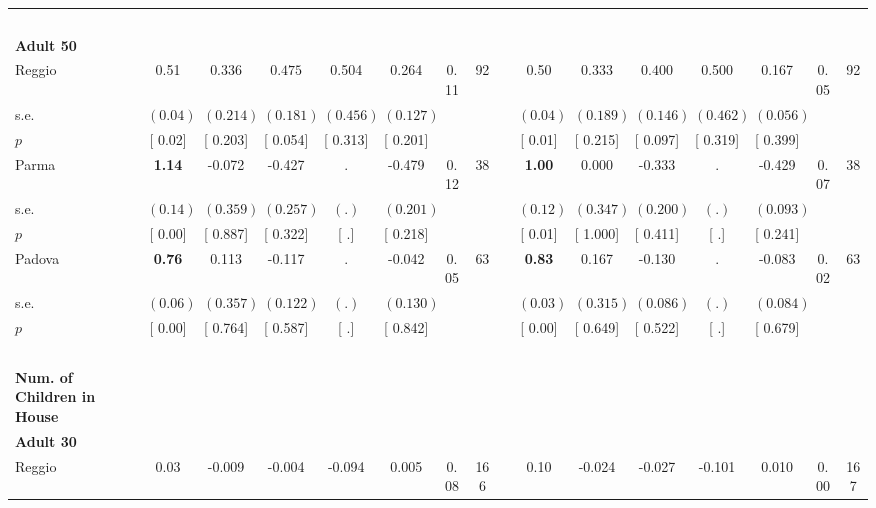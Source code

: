 \begin{longtable}{L{8em} c c c c c c c p{1em} c c c c c c c}
~\\[1em]
\quad \quad \textbf{Adult 50} & & & & & & & & & & & & & & & \\* 
\quad \quad \quad Reggio& 0.51 &     0.336 & $ \mathbf{    0.475}$ &     0.504 &     0.264 &      0.11 &        92 & & 0.50 &     0.333 & $ \mathbf{    0.400}$ &     0.500 &     0.167 &      0.05 &        92  \\*
\quad \quad \quad \quad s.e.& $ (     0.04)$ & $ (    0.214)$ & $ (    0.181)$ & $ (    0.456)$ & $ (    0.127)$ & & & & $ (     0.04)$ & $ (    0.189)$ & $ (    0.146)$ & $ (    0.462)$ & $ (    0.056)$ & &  \\*
\quad \quad \quad \quad $ p$ & [     0.02] & [    0.203] & [    0.054] & [    0.313] & [    0.201] & & & & [     0.01] & [    0.215] & [    0.097] & [    0.319] & [    0.399] & &  \\[1em]
\quad \quad \quad Parma& \textbf{     1.14} &    -0.072 &    -0.427 &         . &    -0.479 &      0.12 &        38 & & \textbf{     1.00} &     0.000 &    -0.333 &         . &    -0.429 &      0.07 &        38  \\*
\quad \quad \quad \quad s.e.& $ (     0.14)$ & $ (    0.359)$ & $ (    0.257)$ & $ (        .)$ & $ (    0.201)$ & & & & $ (     0.12)$ & $ (    0.347)$ & $ (    0.200)$ & $ (        .)$ & $ (    0.093)$ & &  \\*
\quad \quad \quad \quad $ p$ & [     0.00] & [    0.887] & [    0.322] & [        .] & [    0.218] & & & & [     0.01] & [    1.000] & [    0.411] & [        .] & [    0.241] & &  \\[1em]
\quad \quad \quad Padova& \textbf{     0.76} &     0.113 &    -0.117 &         . &    -0.042 &      0.05 &        63 & & \textbf{     0.83} &     0.167 &    -0.130 &         . &    -0.083 &      0.02 &        63  \\*
\quad \quad \quad \quad s.e.& $ (     0.06)$ & $ (    0.357)$ & $ (    0.122)$ & $ (        .)$ & $ (    0.130)$ & & & & $ (     0.03)$ & $ (    0.315)$ & $ (    0.086)$ & $ (        .)$ & $ (    0.084)$ & &  \\*
\quad \quad \quad \quad $ p$ & [     0.00] & [    0.764] & [    0.587] & [        .] & [    0.842] & & & & [     0.00] & [    0.649] & [    0.522] & [        .] & [    0.679] & &  \\[1em]
~\\[1em]
\textbf{Num. of Children in House} \\*
\quad \quad \textbf{Adult 30} & & & & & & & & & & & & & & & \\* 
\quad \quad \quad Reggio& 0.03 &    -0.009 &    -0.004 &    -0.094 &     0.005 &      0.08 &       166 & & 0.10 &    -0.024 &    -0.027 &    -0.101 &     0.010 &      0.00 &       167  \\*

\end{longtable}
